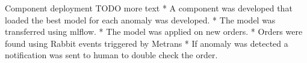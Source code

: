 \chap Component deployment
TODO more text
\begitems
* A component was developed that loaded the best model for each anomaly was developed.
* The model was transferred using mlflow.
* The model was applied on new orders.
* Orders were found using Rabbit events triggered by Metrans
* If anomaly was detected a notification was sent to human to double check the order.
\enditems